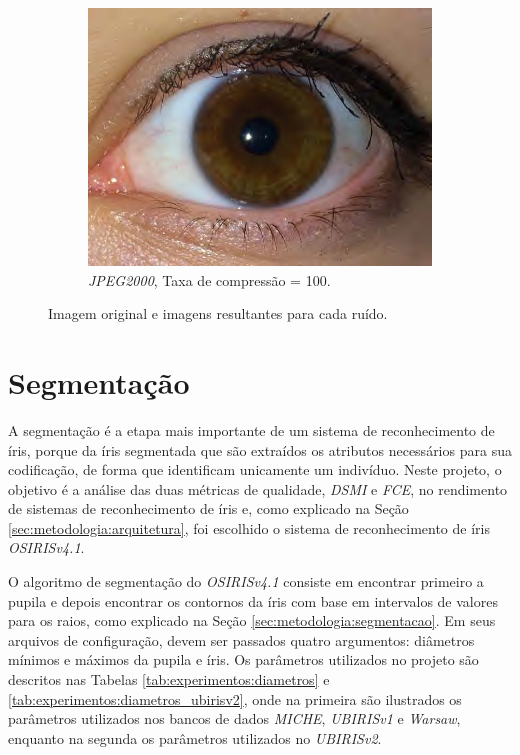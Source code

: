 \begin{figure}[H]
\begin{subfigure}{0.25\textwidth}
  \includegraphics[width=\linewidth]{img/Resultados/ruidos/jpeg2000_100.jpg}
  \caption{\textit{JPEG2000}, Taxa de compressão = 100.}
\end{subfigure}
\caption{Imagem original e imagens resultantes para cada ruído.}
\label{fig:experimentos:ruidos}
\end{figure}

\FloatBarrier

\section{Segmentação} \label{sec:experimentos:segmentacao}

\par A segmentação é a etapa mais importante de um sistema de reconhecimento de íris, porque da íris segmentada que são extraídos os atributos necessários para sua codificação, de forma que identificam unicamente um indivíduo. Neste projeto, o objetivo é a análise das duas métricas de qualidade, \textit{\acrshort{DSMI}} e \textit{\acrshort{FCE}}, no rendimento de sistemas de reconhecimento de íris e, como explicado na Seção \ref{sec:metodologia:arquitetura}, foi escolhido o sistema de reconhecimento de íris \textit{OSIRISv4.1}. 

\par O algoritmo de segmentação do \textit{OSIRISv4.1} consiste em encontrar primeiro a pupila e depois encontrar os contornos da íris com base em intervalos de valores para os raios, como explicado na Seção \ref{sec:metodologia:segmentacao}. Em seus arquivos de configuração, devem ser passados quatro argumentos: diâmetros mínimos e máximos da pupila e íris. Os parâmetros utilizados no projeto são descritos nas Tabelas \ref{tab:experimentos:diametros} e \ref{tab:experimentos:diametros_ubirisv2}, onde na primeira são ilustrados os parâmetros utilizados nos bancos de dados \textit{MICHE}, \textit{UBIRISv1} e \textit{\acrshort{Warsaw}}, enquanto na segunda os parâmetros utilizados no \textit{UBIRISv2}.

